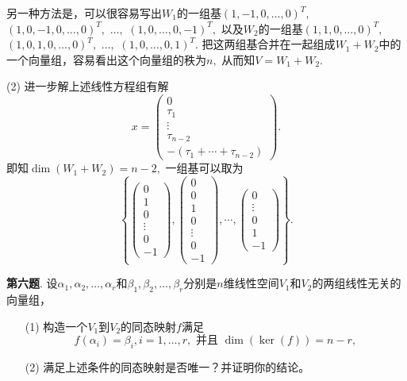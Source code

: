 另一种方法是，可以很容易写出$W_1$的一组基$(1, -1, 0, \ldots, 0)^T,$ $(1, 0, -1, 0, \ldots, 0)^T,$ $\ldots,$ $(1, 0, \ldots, 0, -1)^T,$ 以及$W_2$的一组基$(1, 1, 0, \ldots, 0)^T,$ $(1, 0, 1, 0, \ldots, 0)^T,$ $\ldots,$ $(1, 0, \ldots, 0, 1)^T.$ 把这两组基合并在一起组成$W_1 + W_2$中的一个向量组，容易看出这个向量组的秩为$n,$ 从而知$V = W_1 + W_2.$

(2) 进一步解上述线性方程组有解
$$x = \begin{pmatrix} 0 \\ \tau_1 \\ \vdots \\ \tau_{n-2} \\ -(\tau_1 + \cdots + \tau_{n-2}) \end{pmatrix}.$$
即知$\dim (W_1 + W_2) = n - 2,$ 一组基可以取为
$$\left\{ \begin{pmatrix} 0 \\ 1 \\ 0 \\ \vdots \\ 0 \\ -1 \end{pmatrix}, \begin{pmatrix} 0 \\ 0 \\ 1 \\ 0 \\ \vdots \\ 0 \\ -1 \end{pmatrix}, \cdots, \begin{pmatrix} 0 \\ \vdots \\ 0 \\ 1 \\ -1 \end{pmatrix} \right\}.$$

\newpageorvspace

{\bf 第六题}. 设$\alpha_1, \alpha_2, \ldots, \alpha_r$和$\beta_1, \beta_2, \ldots, \beta_r$分别是$n$维线性空间$V_1$和$V_2$的两组线性无关的向量组，
\begin{itemize}
\item[(1)] 构造一个$V_1$到$V_2$的同态映射$f$满足
$$f(\alpha_i) = \beta_i, i = 1, \ldots, r, \text{ 并且 } \dim(\ker(f)) = n-r,$$
\item[(2)] 满足上述条件的同态映射是否唯一？并证明你的结论。
\end{itemize}

\newpageorvspace

